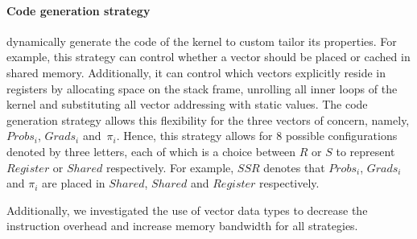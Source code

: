 \paragraph*{\textbf{Code generation strategy}} dynamically generate the code of the kernel to
custom tailor its properties. For example, this strategy can control whether a
vector should be placed or cached in shared memory. Additionally, it can
control which vectors explicitly reside in registers by allocating space on the
stack frame, unrolling all inner loops of the kernel and substituting all
vector addressing with static values. The code generation strategy allows this
flexibility for the three vectors of concern, namely, $Probs_i$, $Grads_i$
and~$\pi_i$.
Hence, this strategy allows for 8 possible configurations denoted by
three letters, each of which is a choice between $R$ or $S$ to represent
$Register$ or $Shared$ respectively. For example, $SSR$ denotes that $Probs_i$,
$Grads_i$ and $\pi_i$ are placed in $Shared$, $Shared$ and $Register$
respectively.

Additionally, we investigated the use of vector data types to decrease the
instruction overhead and increase memory bandwidth for all strategies.
